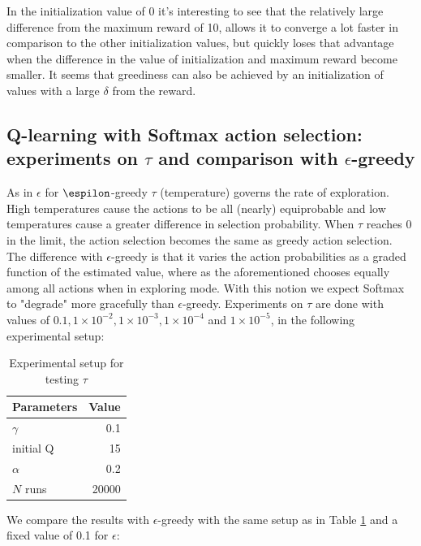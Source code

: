 \documentclass[paper=a4, fontsize=11pt]{scrartcl}
\numberwithin{equation}{section}		%
\numberwithin{figure}{section}			%
\numberwithin{table}{section}				%
\begin{document}
In the initialization value of 0 it's interesting to see that the relatively large difference from the maximum reward of 10, allows it to converge a lot faster in comparison to the other initialization values, but quickly loses that advantage when the difference in the value of initialization and maximum reward become smaller. It seems that greediness can also be achieved by an initialization of values with a large $\delta$ from the reward.

\subsection{Q-learning with Softmax action selection: experiments on $\tau$ and comparison with $\epsilon$-greedy}
As in $\epsilon$ for $\espilon$-greedy $\tau$ (temperature) governs the rate of exploration. High temperatures cause the actions to be all (nearly) equiprobable and low temperatures cause a greater difference in selection probability. When $\tau$ reaches 0 in the limit, the action selection becomes the same as greedy action selection. The difference with $\epsilon$-greedy is that it varies the action probabilities as a graded function of the estimated value, where as the aforementioned chooses equally among all actions when in exploring mode. With this notion we expect Softmax to "degrade" more gracefully than $\epsilon$-greedy. Experiments on $\tau$ are done with values of $0.1, 1 \times 10^{-2}, 1 \times 10^{-3}, 1 \times 10^{-4}$ and $1 \times 10^{-5}$, in the following experimental setup:
\begin{table}[H]
\caption{Experimental setup for testing $\tau$}
\centering
\begin{tabular}{|l|r|}
\hline
Parameters & Value \\\hline
$\gamma$ & 0.1 \\\hline
initial Q & 15 \\\hline
$\alpha$ & 0.2\\\hline
$N$ runs & 20000\\\hline
\end{tabular}
\label{expSetupSoftmax}
\end{table}
We compare the results with $\epsilon$-greedy with the same setup as in Table \ref{expSetupSoftmax} and a fixed value of 0.1 for $\epsilon$:
\end{document}
